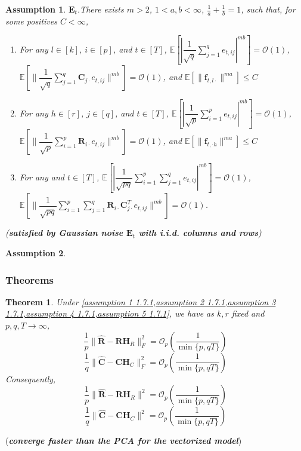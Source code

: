 \documentclass{article}[12pt]
\newtheorem{assumption}{Assumption}
\newtheorem{theorem}{Theorem}
\begin{document}
\begin{assumption}\label{assumption 5 1.7.1}
     $\mathbf{E}_t$.\normalfont  There exists $m>2$, $1<a,b<\infty$, $\frac{1}{a}+\frac{1}{b} = 1$, such that, for some positives $C<\infty$,
    \begin{enumerate}
        \item For any $l \in \left[k\right]$, $i \in \left[p\right]$, and $t \in \left[T\right]$, $\mathbb{E}\left[|\dfrac{1}{\sqrt{q}}\sum_{j=1}^{q}e_{t,ij}|^{mb}\right] = \mathcal{O}(1)$, $\mathbb{E}\left[\lVert\dfrac{1}{\sqrt{q}}\sum_{j=1}^{q}\mathbf{C}_{j\cdot}e_{t,ij}\rVert^{mb}\right] = \mathcal{O}(1)$, and $\mathbb{E}\left[\lVert\mathbf{f}_{t,l\cdot}\rVert^{ma}\right] \leq C$
        \item For any $h \in \left[r\right]$, $j \in \left[q\right]$, and $t \in \left[T\right]$, $\mathbb{E}\left[|\dfrac{1}{\sqrt{p}}\sum_{i=1}^{p}e_{t,ij}|^{mb}\right] = \mathcal{O}(1)$, $\mathbb{E}\left[\lVert\dfrac{1}{\sqrt{p}}\sum_{i=1}^{p}\mathbf{R}_{i\cdot}e_{t,ij}\rVert^{mb}\right] = \mathcal{O}(1)$, and $\mathbb{E}\left[\lVert\mathbf{f}_{t,\cdot h}\rVert^{ma}\right] \leq C$
        \item For any and $t \in \left[T\right]$, $\mathbb{E}\left[|\dfrac{1}{\sqrt{pq}}\sum_{i=1}^{p}\sum_{j=1}^qe_{t,ij}|^{mb}\right] = \mathcal{O}(1)$, $\mathbb{E}\left[\lVert\dfrac{1}{\sqrt{pq}}\sum_{i=1}^{p}\sum_{j=1}^q\mathbf{R}_{i\cdot}\mathbf{C}_{j\cdot}^Te_{t,ij}\rVert^{mb}\right] = \mathcal{O}(1)$.    
    \end{enumerate}
    
    (\textbf{\textit{satisfied by Gaussian noise $\mathbf{E}_t$ with i.i.d. columns and rows}})
\end{assumption}

\begin{assumption}\label{assumption 6 1.7.1}
    
\end{assumption}

\subsubsection{Theorems}




\begin{theorem}
    \normalfont Under  \cref{assumption 1 1.7.1,assumption 2 1.7.1,assumption 3 1.7.1,assumption 4 1.7.1,assumption 5 1.7.1}, we have as $k,r$ fixed and $p,q,T \rightarrow \infty$,
    $$\dfrac{1}{p}\lVert\mathbf{\widehat{R}} - \mathbf{R}\mathbf{H}_R\rVert_F^2 = \mathcal{O}_p\left(\dfrac{1}{\min\{p,qT\}}\right)$$
    $$\dfrac{1}{q}\lVert\mathbf{\widehat{C}} - \mathbf{C}\mathbf{H}_C\rVert_F^2 = \mathcal{O}_p\left(\dfrac{1}{\min\{p,qT\}}\right)$$
Consequently,
    $$\dfrac{1}{p}\lVert\mathbf{\widehat{R}} - \mathbf{R}\mathbf{H}_R\rVert^2 = \mathcal{O}_p\left(\dfrac{1}{\min\{p,qT\}}\right)$$
    $$\dfrac{1}{q}\lVert\mathbf{\widehat{C}} - \mathbf{C}\mathbf{H}_C\rVert^2 = \mathcal{O}_p\left(\dfrac{1}{\min\{p,qT\}}\right)$$
\end{theorem}
\noindent (\textbf{\textit{converge faster than the PCA for the vectorized model}})
\end{document}
